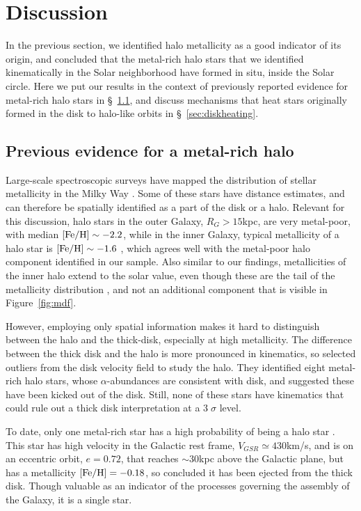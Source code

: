 \documentclass[apj, twocolappendix, numberedappendix, appendixfloats]{emulateapj}
\begin{document}
\section{Discussion}
\label{sec:discussion}
In the previous section, we identified halo metallicity as a good indicator of its origin, and concluded that the metal-rich halo stars that we identified kinematically in the Solar neighborhood have formed in situ, inside the Solar circle.
Here we put our results in the context of previously reported evidence for metal-rich halo stars in \S~\ref{sec:previous}, and discuss mechanisms that heat stars originally formed in the disk to halo-like orbits in \S~\ref{sec:diskheating}.

\subsection{Previous evidence for a metal-rich halo}
\label{sec:previous}
Large-scale spectroscopic surveys have mapped the distribution of stellar metallicity in the Milky Way \citep[e.g.,][]{ivezic2008}.
Some of these stars have distance estimates, and can therefore be spatially identified as a part of the disk or a halo.
Relevant for this discussion, halo stars in the outer Galaxy, $R_{G}>15$\;kpc, are very metal-poor, with median $\rm[Fe/H]\sim-2.2$, while in the inner Galaxy, typical metallicity of a halo star is $\rm[Fe/H]\sim-1.6$ \citep[e.g.,][]{carollo2007, dejong2010}, which agrees well with the metal-poor halo component identified in our sample.
Also similar to our findings, metallicities of the inner halo extend to the solar value, even though these are the tail of the metallicity distribution \citep[e.g.,][]{allendeprieto2006}, and not an additional component that is visible in Figure~\ref{fig:mdf}.

However, employing only spatial information makes it hard to distinguish between the halo and the thick-disk, especially at high metallicity.
The difference between the thick disk and the halo is more pronounced in kinematics, so \citet{sheffield2012} selected outliers from the disk velocity field to study the halo.
They identified eight metal-rich halo stars, whose $\alpha$-abundances are consistent with disk, and suggested these have been kicked out of the disk.
Still, none of these stars have kinematics that could rule out a thick disk interpretation at a $3\;\sigma$ level.

To date, only one metal-rich star has a high probability of being a halo star \citep{hawkins2015}.
This star has high velocity in the Galactic rest frame, $V_{GSR}\simeq430$\;km/s, and is on an eccentric orbit, $e=0.72$, that reaches $\sim30$\;kpc above the Galactic plane, but has a metallicity $\rm[Fe/H]=-0.18$, so \citet{hawkins2015} concluded it has been ejected from the thick disk.
Though valuable as an indicator of the processes governing the assembly of the Galaxy, it is a single star.
\end{document}
